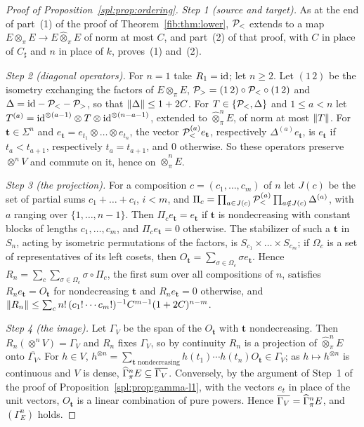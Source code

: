 \begin{proof}[Proof of Proposition~\ref{spl:prop:ordering}]
\emph{Step 1 (source and target).} As at the end of part~(1) of the proof of Theorem~\ref{fib:thm:lower}, $\mathcal P_<$
extends to a map $E\otimes_\pi E\to E\widehat\otimes_\pi E$ of norm at most $C$, and part~(2) of that proof, with $C$ in
place of $C_\sharp$ and $n$ in place of $k$, proves~(1) and~(2).

\emph{Step 2 (diagonal operators).} For $n=1$ take $R_1=\mathrm{id}$; let $n\ge2$. Let $(1\,2)$ be the isometry exchanging the
factors of $E\otimes_\pi E$, $\mathcal P_>=(1\,2)\circ\mathcal P_<\circ(1\,2)$ and $\Delta=\mathrm{id}-\mathcal P_<-\mathcal P_>$, so that
$\lVert \Delta\rVert\le1+2C$. For $T\in\{\mathcal P_<,\Delta\}$ and $1\le a<n$ let
$T^{(a)}=\mathrm{id}^{\otimes(a-1)}\otimes T\otimes\mathrm{id}^{\otimes(n-a-1)}$, extended to $\widehat\otimes^n_\pi E$, of norm at most
$\lVert T\rVert$. For $\mathbf t\in\Sigma^n$ and $e_{\mathbf t}=e_{t_1}\otimes\dots\otimes e_{t_n}$, the vector
$\mathcal P_<^{(a)}e_{\mathbf t}$, respectively $\Delta^{(a)}e_{\mathbf t}$, is $e_{\mathbf t}$ if $t_a<t_{a+1}$, respectively
$t_a=t_{a+1}$, and $0$ otherwise. So these operators preserve $\otimes^nV$ and commute on it, hence on
$\widehat\otimes^n_\pi E$.

\emph{Step 3 (the projection).} For a composition $c=(c_1,\dots,c_m)$ of $n$ let $J(c)$ be the set of partial sums
$c_1+\dots+c_i$, $i<m$, and $\Pi_c=\prod_{a\in J(c)}\mathcal P_<^{(a)}\prod_{a\notin J(c)}\Delta^{(a)}$, with $a$ ranging over
$\{1,\dots,n-1\}$. Then $\Pi_ce_{\mathbf t}=e_{\mathbf t}$ if $\mathbf t$ is nondecreasing with constant blocks of
lengths $c_1,\dots,c_m$, and $\Pi_ce_{\mathbf t}=0$ otherwise. The stabilizer of such a $\mathbf t$ in $S_n$, acting by
isometric permutations of the factors, is $S_{c_1}\times\dots\times S_{c_m}$; if $\Omega_c$ is a set of representatives
of its left cosets, then $O_{\mathbf t}=\sum_{\sigma\in\Omega_c}\sigma e_{\mathbf t}$. Hence
$R_n=\sum_c\sum_{\sigma\in\Omega_c}\sigma\circ\Pi_c$, the first sum over all compositions of $n$, satisfies
$R_ne_{\mathbf t}=O_{\mathbf t}$ for nondecreasing $\mathbf t$ and $R_ne_{\mathbf t}=0$ otherwise, and
$\lVert R_n\rVert\le\sum_cn!\,(c_1!\cdots c_m!)^{-1}C^{m-1}(1+2C)^{n-m}$.

\emph{Step 4 (the image).} Let $\Gamma_V$ be the span of the $O_{\mathbf t}$ with $\mathbf t$ nondecreasing. Then
$R_n(\otimes^nV)=\Gamma_V$ and $R_n$ fixes $\Gamma_V$, so by continuity $R_n$ is a projection of
$\widehat\otimes^n_\pi E$ onto $\overline{\Gamma_V}$. For $h\in V$,
$h^{\otimes n}=\sum_{\mathbf t\text{ nondecreasing}}h(t_1)\cdots h(t_n)O_{\mathbf t}\in\Gamma_V$; as
$h\mapsto h^{\otimes n}$ is continuous and $V$ is dense, $\widehat\Gamma^n_\pi E\subseteq\overline{\Gamma_V}$. Conversely, by
the argument of Step~1 of the proof of Proposition~\ref{spl:prop:gamma-l1}, with the vectors $e_t$ in place of the unit
vectors, $O_{\mathbf t}$ is a linear combination of pure powers. Hence $\overline{\Gamma_V}=\widehat\Gamma^n_\pi E$, and
$(\Gamma^n_E)$ holds.
\end{proof}

